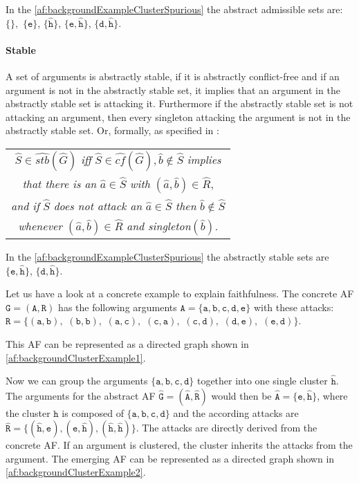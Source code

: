 In the \cref{af:backgroundExampleClusterSpurious} the abstract admissible sets are:
$\mathtt{\{\}},$
$\mathtt{\{e}\}$,
$\mathtt{\{\hat{h}}\}$,
$\mathtt{\{e, \hat{h}}\}$,
$\mathtt{\{d, \hat{h}}\}$.



\paragraph{Stable} A set of arguments is abstractly stable, if it is abstractly conflict-free and if an argument is not in the abstractly stable set, it implies that an argument in the abstractly stable set is attacking it. Furthermore if the abstractly stable set is not attacking an argument, then every singleton attacking the argument is not in the abstractly stable set. Or, formally, as specified in \cite{DBLP:conf/kr/SaribaturW21}:
\begin{center}
    \begin{tabular}{c}
        $\hat{S} \in \hat{stb}(\hat{G})$ \textit{iff} $\hat{S} \in \hat{cf}(\hat{G}),  \hat{b} \not\in \hat{S}$ \textit{implies}\\

        \textit{that there is an} $\hat{a} \in \hat{S}$ \textit{with} $(\hat{a}, \hat{b}) \in \hat{R}$,\\

        \textit{and if} $\hat{S}$ \textit{does not attack an} $\hat{a} \in \hat{S}$ \textit{then} $\hat{b} \not\in \hat{S}$\\

        \textit{whenever} $(\hat{a}, \hat{b}) \in \hat{R}$ \textit{and singleton}$(\hat{b})$.
    \end{tabular}
\end{center}

In the \cref{af:backgroundExampleClusterSpurious} the abstractly stable sets are
$\mathtt{\{e, \hat{h}}\}$,
$\mathtt{\{d, \hat{h}}\}$.

\vspace{0.5cm}
\noindent
Let us have a look at a concrete example to explain faithfulness. The concrete AF $\mathtt{G=(A, R)}$ has the following arguments $\mathtt{A=\{a, b, c, d, e\}}$ with these attacks:
$\mathtt{R=\{(a,b),}$
$\mathtt{(b,b),}$
$\mathtt{(a,c),}$
$\mathtt{(c,a),}$
$\mathtt{(c,d),}$
$\mathtt{(d,e),}$
$\mathtt{(e,d)\}}$.

This AF can be represented as a directed graph shown in \cref{af:backgroundClusterExample1}.

Now we can group the arguments $\mathtt{\{a, b, c, d\}}$ together into one single cluster $\mathtt{\hat{h}}$. The arguments for the abstract AF $\mathtt{\hat{G} = (\hat{A}, \hat{R})}$ would then be $\mathtt{\hat{A}=\{e, \hat{h}\}}$, where the cluster $\mathtt{\hat{h}}$ is composed of $\mathtt{\{a, b, c, d\}}$ and the according attacks are
$\mathtt{\hat{R}=\{(\hat{h}, e), (e, \hat{h}), (\hat{h}, \hat{h})\}}$. The attacks are directly derived from the concrete AF. If an argument is clustered, the cluster inherits the attacks from the argument. The emerging AF can be represented as a directed graph shown in \cref{af:backgroundClusterExample2}.


